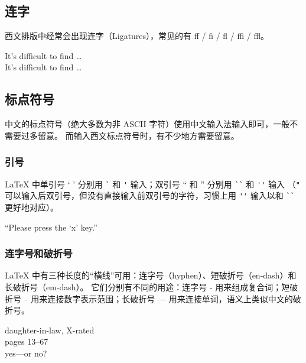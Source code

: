 \subsection{连字}\label{subsec:ligatures}

西文排版中经常会出现连字（Ligatures），常见的有 ff / fi / fl / ffi / ffl{}。
\begin{example}
It's difficult to find \ldots\\
It's dif{}f{}icult to f{}ind \ldots
\end{example}

\subsection{标点符号}\label{subsec:punct}

中文的标点符号（绝大多数为非 ASCII 字符）使用中文输入法输入即可，一般不需要过多留意。
而输入西文标点符号时，有不少地方需要留意。

\subsubsection{引号}

\LaTeX{} 中单引号 ` ' 分别用 \verb|`| 和 \verb|'| 输入；双引号 `` 和 '' 分别用 \verb|``| 和 \verb|''| 输入
（\verb|"| 可以输入后双引号，但没有直接输入前双引号的字符，习惯上用 \verb|''| 输入以和 \verb|``| 更好地对应）。
\begin{example}
``Please press the `x' key.''
\end{example}

\subsubsection{连字号和破折号}

\LaTeX{} 中有三种长度的“横线”可用：连字号（hyphen）、短破折号（en-dash）和长破折号（em-dash）。
它们分别有不同的用途：连字号 - 用来组成复合词；短破折号 -- 用来连接数字表示范围；长破折号 --- 用来连接单词，语义上类似中文的破折号。
\begin{example}
daughter-in-law, X-rated\\
pages 13--67\\
yes---or no?
\end{example}

